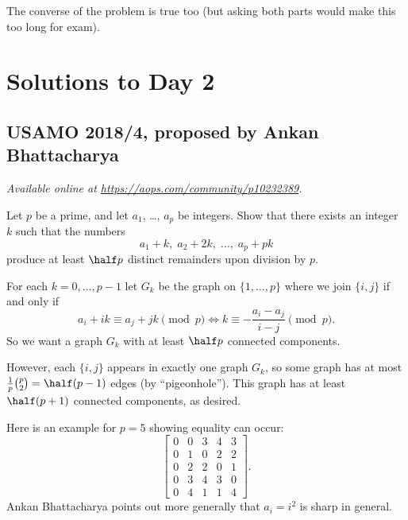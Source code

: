 \documentclass[11pt]{scrartcl}
\begin{document}
\begin{remark*}
  The converse of the problem is true too
  (but asking both parts would make this too long for exam).
\end{remark*}
\pagebreak

\section{Solutions to Day 2}
\subsection{USAMO 2018/4, proposed by Ankan Bhattacharya}
\textsl{Available online at \url{https://aops.com/community/p10232389}.}
\begin{mdframed}[style=mdpurplebox,frametitle={Problem statement}]
Let $p$ be a prime, and let $a_1$, \dots, $a_p$ be integers.
Show that there exists an integer $k$ such that the numbers
\[ a_1 + k, \; a_2 + 2k, \; \dots, \; a_p + pk \]
produce at least $\half p$ distinct remainders upon division by $p$.
\end{mdframed}
For each $k = 0, \dots, p-1$ let $G_k$ be the graph
on $\{1, \dots, p\}$ where we join $\{i,j\}$ if and only if
\[ a_i + ik \equiv a_j + jk \pmod p
  \iff k \equiv - \frac{a_i - a_j}{i-j} \pmod p. \]
So we want a graph $G_k$ with at least $\half p$ connected components.

However, each $\{i,j\}$ appears in exactly one graph $G_k$,
so some graph has at most $\frac 1p \binom p2 = \half(p-1)$ edges
(by ``pigeonhole'').
This graph has at least $\half(p+1)$ connected components, as desired.

\begin{remark*}
  Here is an example for $p=5$ showing equality can occur:
  \[
    \begin{bmatrix}
      0 & 0 & 3 & 4 & 3 \\
      0 & 1 & 0 & 2 & 2 \\
      0 & 2 & 2 & 0 & 1 \\
      0 & 3 & 4 & 3 & 0 \\
      0 & 4 & 1 & 1 & 4
    \end{bmatrix}.
  \]
  Ankan Bhattacharya points out more generally
  that $a_i = i^2$ is sharp in general.
\end{remark*}
\pagebreak
\end{document}
